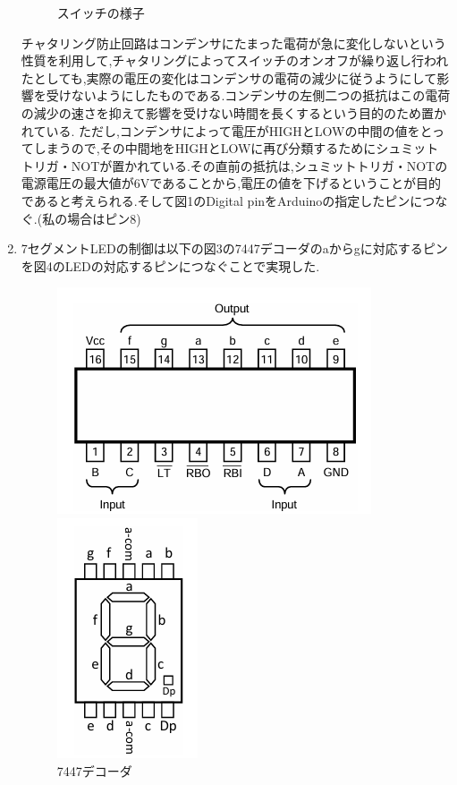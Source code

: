 \documentclass[dvipdfmx]{jarticle}
\begin{document}
\begin{enumerate}
\begin{figure}[h]
\begin{minipage}[b]{0.45\linewidth}
          \caption{スイッチの様子}
        \end{minipage}
      \end{figure}
      チャタリング防止回路はコンデンサにたまった電荷が急に変化しないという性質を利用して,チャタリングによってスイッチのオンオフが繰り返し行われたとしても,実際の電圧の変化はコンデンサの電荷の減少に従うようにして影響を受けないようにしたものである.コンデンサの左側二つの抵抗はこの電荷の減少の速さを抑えて影響を受けない時間を長くするという目的のため置かれている.
    ただし,コンデンサによって電圧がHIGHとLOWの中間の値をとってしまうので,その中間地をHIGHとLOWに再び分類するためにシュミットトリガ・NOTが置かれている.その直前の抵抗は,シュミットトリガ・NOTの電源電圧の最大値が6Vであることから,電圧の値を下げるということが目的であると考えられる.\cite{3}そして図1のDigital pinをArduinoの指定したピンにつなぐ.(私の場合はピン8)
    \item 7セグメントLEDの制御は以下の図3の7447デコーダのaからgに対応するピンを図4のLEDの対応するピンにつなぐことで実現した.\cite{1}
    \begin{figure}[h]
        \begin{minipage}[b]{0.45\linewidth}
          \centering
          \includegraphics[keepaspectratio, scale=0.4]{7447.png}
          \caption{7447デコーダ}
        \end{minipage}
        \begin{minipage}[b]{0.45\linewidth}
          \centering
          \includegraphics[keepaspectratio, scale=0.4]{7seg.png}

\end{minipage}
\end{figure}
\end{enumerate}
\end{document}
